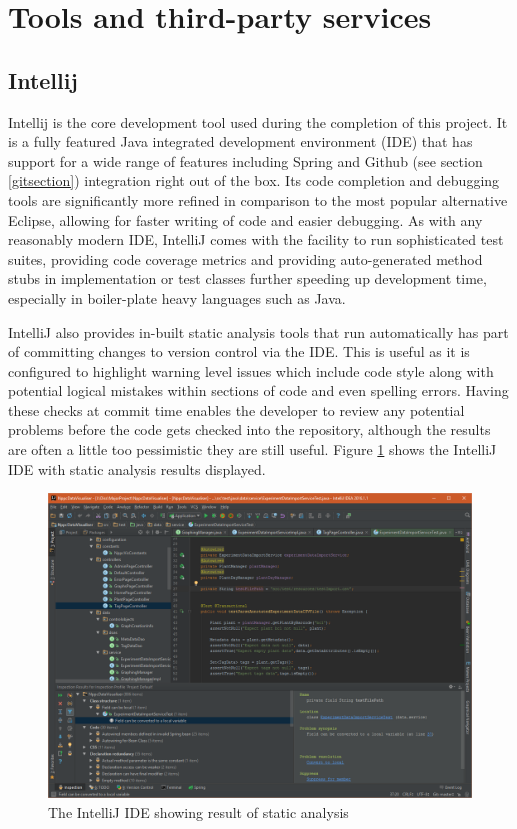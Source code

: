 \section{Tools and third-party services}
\subsection{Intellij}

Intellij \cite{_intellij} is the core development tool used during the completion of this project. It is a fully featured Java integrated development environment (IDE) that has support for a wide range of features including Spring and Github (see section \ref{gitsection}) integration right out of the box. Its code completion and debugging tools are significantly more refined in comparison to the most popular alternative Eclipse, allowing for faster writing of code and easier debugging. As with any reasonably modern IDE, IntelliJ comes with the facility to run sophisticated test suites, providing code coverage metrics and providing auto-generated method stubs in implementation or test classes further speeding up development time, especially in boiler-plate heavy languages such as Java.

IntelliJ also provides in-built static analysis tools that run automatically has part of committing changes to version control via the IDE. This is useful as it is configured to highlight warning level issues which include code style along with potential logical mistakes within sections of code and even spelling errors. Having these checks at commit time enables the developer to review any potential problems before the code gets checked into the repository, although the results are often a little too pessimistic they are still useful. Figure \ref{fig:intellij} shows the IntelliJ IDE with static analysis results displayed.

\begin{figure}[H]
    \centering
    \includegraphics[width=\textwidth]{images/tools/intellij}
    \caption{The IntelliJ IDE showing result of static analysis}
    \label{fig:intellij}
\end{figure}

